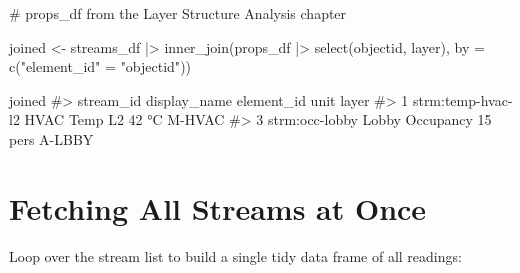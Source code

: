 \documentclass[
  11pt,
  letterpaper,
  DIV=11,
  numbers=noendperiod]{scrreprt}
\newenvironment{Shaded}{\begin{snugshade}}{\end{snugshade}}
\newcommand{\AttributeTok}[1]{\textcolor[rgb]{0.40,0.45,0.13}{#1}}
\newcommand{\CommentTok}[1]{\textcolor[rgb]{0.37,0.37,0.37}{#1}}
\newcommand{\FunctionTok}[1]{\textcolor[rgb]{0.28,0.35,0.67}{#1}}
\newcommand{\NormalTok}[1]{\textcolor[rgb]{0.00,0.23,0.31}{#1}}
\newcommand{\OtherTok}[1]{\textcolor[rgb]{0.00,0.23,0.31}{#1}}
\newcommand{\SpecialCharTok}[1]{\textcolor[rgb]{0.37,0.37,0.37}{#1}}
\newcommand{\StringTok}[1]{\textcolor[rgb]{0.13,0.47,0.30}{#1}}
\begin{document}
\begin{Shaded}
\begin{Highlighting}[]
\CommentTok{\# props\_df from the Layer Structure Analysis chapter}

\NormalTok{joined }\OtherTok{\textless{}{-}}\NormalTok{ streams\_df }\SpecialCharTok{|\textgreater{}}
  \FunctionTok{inner\_join}\NormalTok{(props\_df }\SpecialCharTok{|\textgreater{}} \FunctionTok{select}\NormalTok{(objectid, layer),}
             \AttributeTok{by =} \FunctionTok{c}\NormalTok{(}\StringTok{"element\_id"} \OtherTok{=} \StringTok{"objectid"}\NormalTok{))}

\NormalTok{joined}
\CommentTok{\#\textgreater{}            stream\_id    display\_name element\_id   unit layer}
\CommentTok{\#\textgreater{} 1  strm:temp{-}hvac{-}l2  HVAC Temp L2          42    °C  M{-}HVAC}
\CommentTok{\#\textgreater{} 3  strm:occ{-}lobby     Lobby Occupancy        15  pers A{-}LBBY}
\end{Highlighting}
\end{Shaded}

\section{Fetching All Streams at
Once}\label{fetching-all-streams-at-once}

Loop over the stream list to build a single tidy data frame of all
readings:
\end{document}
